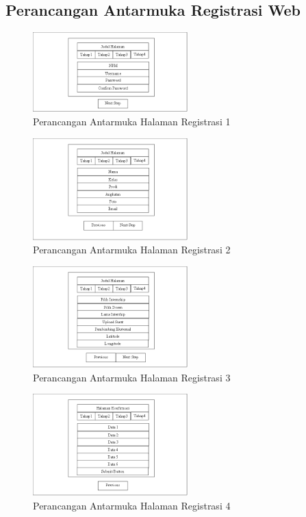 \subsection{Perancangan Antarmuka Registrasi Web }
	\begin{figure}[H]
		\includegraphics[width=6cm]{figures/diagram/image116.png}
		\centering
		\caption{Perancangan Antarmuka Halaman Registrasi 1}
	\end{figure}
	\begin{figure}[H]
		\includegraphics[width=6cm]{figures/diagram/image117.png}
		\centering
		\caption{Perancangan Antarmuka Halaman Registrasi 2}
	\end{figure}
	\begin{figure}[H]
		\includegraphics[width=6cm]{figures/diagram/image118.png}
		\centering
		\caption{Perancangan Antarmuka Halaman Registrasi 3}
	\end{figure}
	\begin{figure}[H]
		\includegraphics[width=6cm]{figures/diagram/image119.png}
		\centering
		\caption{Perancangan Antarmuka Halaman Registrasi 4}
	\end{figure}
